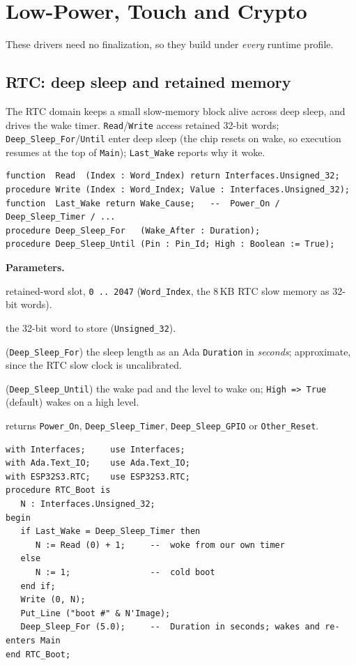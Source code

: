 \chapter{Low-Power, Touch and Crypto}
\label{ch:hal3}

These drivers need no finalization, so they build under \emph{every} runtime
profile.

\section{RTC: deep sleep and retained memory}

The RTC domain keeps a small slow-memory block alive across deep sleep, and
drives the wake timer. \texttt{Read}/\texttt{Write} access retained 32-bit words;
\texttt{Deep\_Sleep\_For}/\texttt{Until} enter deep sleep (the chip resets on
wake, so execution resumes at the top of \texttt{Main}); \texttt{Last\_Wake}
reports why it woke.

\begin{lstlisting}
function  Read  (Index : Word_Index) return Interfaces.Unsigned_32;
procedure Write (Index : Word_Index; Value : Interfaces.Unsigned_32);
function  Last_Wake return Wake_Cause;   --  Power_On / Deep_Sleep_Timer / ...
procedure Deep_Sleep_For   (Wake_After : Duration);
procedure Deep_Sleep_Until (Pin : Pin_Id; High : Boolean := True);
\end{lstlisting}

\textbf{Parameters.}
\begin{description}[style=nextline]
\item[\texttt{Index}] retained-word slot, \texttt{0\,..\,2047}
  (\texttt{Word\_Index}, the 8\,KB RTC slow memory as 32-bit words).
\item[\texttt{Value}] the 32-bit word to store (\texttt{Unsigned\_32}).
\item[\texttt{Wake\_After}] (\texttt{Deep\_Sleep\_For}) the sleep length as an Ada
  \texttt{Duration} in \emph{seconds}; approximate, since the RTC slow clock is
  uncalibrated.
\item[\texttt{Pin}, \texttt{High}] (\texttt{Deep\_Sleep\_Until}) the wake pad and
  the level to wake on; \texttt{High => True} (default) wakes on a high level.
\item[\texttt{Last\_Wake}] returns \texttt{Power\_On}, \texttt{Deep\_Sleep\_Timer},
  \texttt{Deep\_Sleep\_GPIO} or \texttt{Other\_Reset}.
\end{description}

\begin{lstlisting}
with Interfaces;     use Interfaces;
with Ada.Text_IO;    use Ada.Text_IO;
with ESP32S3.RTC;    use ESP32S3.RTC;
procedure RTC_Boot is
   N : Interfaces.Unsigned_32;
begin
   if Last_Wake = Deep_Sleep_Timer then
      N := Read (0) + 1;     --  woke from our own timer
   else
      N := 1;                --  cold boot
   end if;
   Write (0, N);
   Put_Line ("boot #" & N'Image);
   Deep_Sleep_For (5.0);     --  Duration in seconds; wakes and re-enters Main
end RTC_Boot;
\end{lstlisting}

